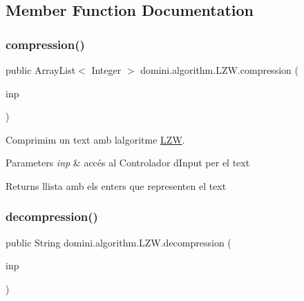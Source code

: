 \subsection{Member Function Documentation}
\mbox{\label{classdomini_1_1algorithm_1_1LZW_a79ce338289c3e8fcdd111ca029cfb45b}} 
\subsubsection{\texorpdfstring{compression()}{compression()}}
{\footnotesize\ttfamily public Array\+List$<$ Integer $>$ domini.\+algorithm.\+L\+Z\+W.\+compression (\begin{DoxyParamCaption}\item[{\hyperlink{classpersistencia_1_1input_1_1Ctrl__Input__Text}{Ctrl\+\_\+\+Input\+\_\+\+Text}}]{inp }\end{DoxyParamCaption})\hspace{0.3cm}{\ttfamily [inline]}}



Comprimim un text amb l\textquotesingle{}algoritme \hyperlink{classdomini_1_1algorithm_1_1LZW}{L\+ZW}. 


\begin{DoxyParams}{Parameters}
{\em inp} & accés al Controlador d\textquotesingle{}Input per el text \\
\hline
\end{DoxyParams}
\begin{DoxyReturn}{Returns}
llista amb els enters que representen el text 
\end{DoxyReturn}
\mbox{\label{classdomini_1_1algorithm_1_1LZW_a1c7f66a62ed475a72a49f294c41f54fa}} 
\subsubsection{\texorpdfstring{decompression()}{decompression()}}
{\footnotesize\ttfamily public String domini.\+algorithm.\+L\+Z\+W.\+decompression (\begin{DoxyParamCaption}\item[{\hyperlink{classpersistencia_1_1input_1_1Ctrl__Input__LZW}{Ctrl\+\_\+\+Input\+\_\+\+L\+ZW}}]{inp }\end{DoxyParamCaption})\hspace{0.3cm}{\ttfamily [inline]}}



